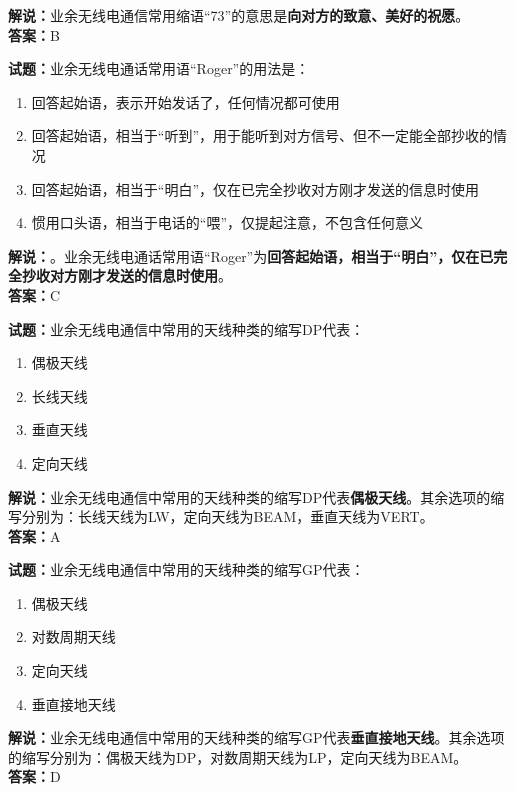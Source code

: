 \documentclass{ctexbook}
\begin{document}
\noindent\textbf{解说：}业余无线电通信常用缩语“73”的意思是\textbf{向对方的致意、美好的祝愿}。\\\noindent\textbf{答案：}B


\bigskip


\noindent\textbf{试题：}业余无线电通话常用语“Roger”的用法是：

\begin{enumerate}[leftmargin=3em]
	\item 回答起始语，表示开始发话了，任何情况都可使用
	\item 回答起始语，相当于“听到”，用于能听到对方信号、但不一定能全部抄收的情况
	\item 回答起始语，相当于“明白”，仅在已完全抄收对方刚才发送的信息时使用
	\item 惯用口头语，相当于电话的“喂”，仅提起注意，不包含任何意义
\end{enumerate}

\noindent\textbf{解说：}。业余无线电通话常用语“Roger”为\textbf{回答起始语，相当于“明白”，仅在已完全抄收对方刚才发送的信息时使用}。\\\noindent\textbf{答案：}C


\bigskip


\noindent\textbf{试题：}业余无线电通信中常用的天线种类的缩写DP代表：

\begin{enumerate}[leftmargin=3em]
	\item 偶极天线
	\item 长线天线
	\item 垂直天线
	\item 定向天线
\end{enumerate}

\noindent\textbf{解说：}业余无线电通信中常用的天线种类的缩写DP代表\textbf{偶极天线}。其余选项的缩写分别为：长线天线为LW，定向天线为BEAM，垂直天线为VERT。\\\noindent\textbf{答案：}A


\bigskip


\noindent\textbf{试题：}业余无线电通信中常用的天线种类的缩写GP代表：

\begin{enumerate}[leftmargin=3em]
	\item 偶极天线
	\item 对数周期天线
	\item 定向天线
	\item 垂直接地天线
\end{enumerate}

\noindent\textbf{解说：}业余无线电通信中常用的天线种类的缩写GP代表\textbf{垂直接地天线}。其余选项的缩写分别为：偶极天线为DP，对数周期天线为LP，定向天线为BEAM。\\\noindent\textbf{答案：}D
\end{document}
